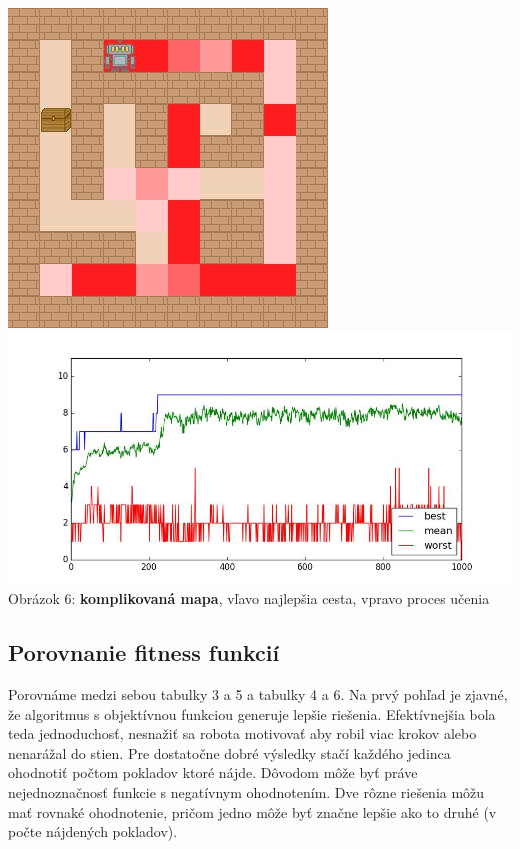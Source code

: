 \documentclass[10pt]{paper}
\begin{document}
\begin{center}
  \includegraphics[scale=0.4]{strategy2_complicated.png} 
  \includegraphics[scale=0.3]{strategy2_complicated_graph.png} \\
   Obrázok 6: \textbf{komplikovaná mapa}, vľavo najlepšia cesta, vpravo proces učenia
     \end{center}
    
\subsection{Porovnanie fitness funkcií}

Porovnáme medzi sebou tabulky 3 a 5 a tabulky 4 a 6. Na prvý pohľad je zjavné, že algoritmus s objektívnou funkciou generuje lepšie riešenia. Efektívnejšia bola teda jednoduchosť, nesnažiť sa robota motivovať aby robil viac krokov alebo nenarážal do stien. Pre dostatočne dobré výsledky stačí každého jedinca ohodnotiť počtom pokladov ktoré nájde. Dôvodom môže byť práve nejednoznačnosť funkcie s negatívnym ohodnotením. Dve rôzne riešenia môžu mať rovnaké ohodnotenie, pričom jedno môže byť značne lepšie ako to druhé (v počte nájdených pokladov).
\end{document}
